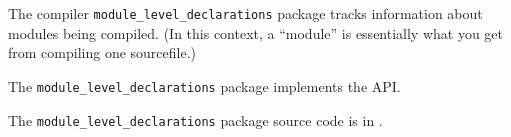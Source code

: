 
The compiler {\tt module\_level\_declarations} package tracks information about modules being 
compiled.  (In this context, a ``module'' is essentially what you get from 
compiling one sourcefile.)

The {\tt module\_level\_declarations} package implements the  API.

The {\tt module\_level\_declarations} package source code is in .



